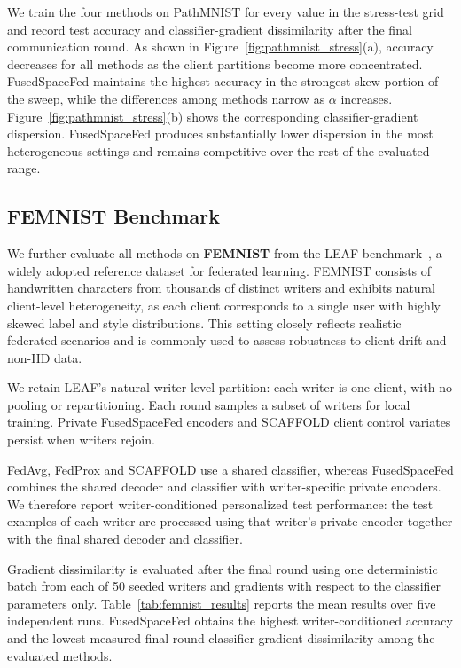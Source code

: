\documentclass[twoside]{article}
\theoremstyle{thmstyleone}%
\theoremstyle{thmstyletwo}%
\theoremstyle{thmstylethree}%
\begin{document}
We train the four methods on PathMNIST for every
value in the stress-test grid and record test accuracy and classifier-gradient
dissimilarity after the final communication round. As shown in
Figure~\ref{fig:pathmnist_stress}(a), accuracy decreases for all methods
as the client partitions become more concentrated. FusedSpaceFed maintains the
highest accuracy in the strongest-skew portion of the sweep, while the
differences among methods narrow as $\alpha$ increases.
Figure~\ref{fig:pathmnist_stress}(b) shows the corresponding
classifier-gradient dispersion. FusedSpaceFed produces substantially lower
dispersion in the most heterogeneous settings and remains competitive over the
rest of the evaluated range.




\subsection{FEMNIST Benchmark}

We further evaluate all methods on \textbf{FEMNIST} from the \textsc{LEAF} benchmark~\cite{caldas2018leaf}, a widely adopted reference dataset for federated learning. FEMNIST consists of handwritten characters from thousands of distinct writers and exhibits natural client-level heterogeneity, as each client corresponds to a single user with highly skewed label and style distributions. This setting closely reflects realistic federated scenarios and is commonly used to assess robustness to client drift and non-IID data.

We retain LEAF's natural writer-level partition: each writer is one client,
with no pooling or repartitioning. Each round samples a subset of writers for
local training. Private FusedSpaceFed encoders and SCAFFOLD client control
variates persist when writers rejoin.

FedAvg, FedProx and SCAFFOLD use a shared classifier, whereas FusedSpaceFed
combines the shared decoder and classifier with writer-specific private
encoders. We therefore report writer-conditioned personalized test
performance: the test examples of each writer are processed using that
writer's private encoder together with the final shared decoder and classifier.

Gradient dissimilarity is evaluated after the final round using one
deterministic batch from each of 50 seeded writers and gradients with respect
to the classifier parameters only. Table~\ref{tab:femnist_results} reports the
mean results over five independent runs. FusedSpaceFed obtains the highest
writer-conditioned accuracy and the lowest measured final-round classifier
gradient dissimilarity among the evaluated methods.
\end{document}
